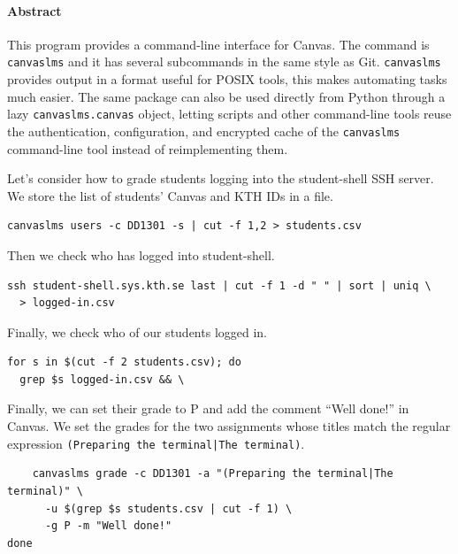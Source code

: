 \paragraph{Abstract}


This program provides a command-line interface for Canvas.
The command is \texttt{canvaslms} and it has several subcommands in the same 
style as Git.
\texttt{canvaslms} provides output in a format useful for POSIX tools, this 
makes automating tasks much easier.
The same package can also be used directly from Python through a lazy
\texttt{canvaslms.canvas} object, letting scripts and other command-line tools
reuse the authentication, configuration, and encrypted cache of the
\texttt{canvaslms} command-line tool instead of reimplementing them.

Let's consider how to grade students logging into the student-shell SSH server.
We store the list of students' Canvas and KTH IDs in a file.
\begin{verbatim}
canvaslms users -c DD1301 -s | cut -f 1,2 > students.csv
\end{verbatim}
Then we check who has logged into student-shell.
\begin{verbatim}
ssh student-shell.sys.kth.se last | cut -f 1 -d " " | sort | uniq \
  > logged-in.csv
\end{verbatim}
Finally, we check who of our students logged in.
\begin{verbatim}
for s in $(cut -f 2 students.csv); do
  grep $s logged-in.csv && \
\end{verbatim}
Finally, we can set their grade to P and add the comment \enquote{Well done!} 
in Canvas.
We set the grades for the two assignments whose titles match the regular 
expression \texttt{(Preparing the terminal|The terminal)}.
\begin{verbatim}
    canvaslms grade -c DD1301 -a "(Preparing the terminal|The terminal)" \
      -u $(grep $s students.csv | cut -f 1) \
      -g P -m "Well done!"
done
\end{verbatim}
